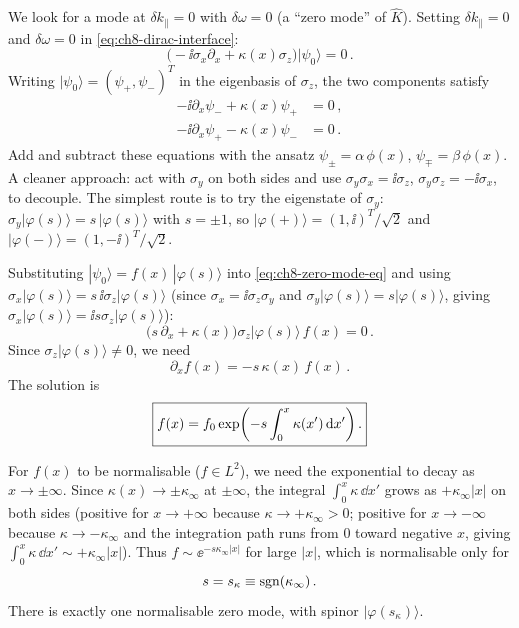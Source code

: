 We look for a mode at $\delta k_\parallel=0$ with $\delta\omega=0$ (a
``zero mode'' of $\hat{K}$).  Setting $\delta k_\parallel=0$ and
$\delta\omega=0$ in \eqref{eq:ch8-dirac-interface}:
\begin{equation}\label{eq:ch8-zero-mode-eq}
  \bigl(-\ii\sigma_x\partial_x + \kappa(x)\sigma_z\bigr)|\psi_0\rangle
  = 0\,.
\end{equation}
Writing $|\psi_0\rangle=(\psi_+,\psi_-)^T$ in the eigenbasis of
$\sigma_z$, the two components satisfy
\begin{subequations}\label{eq:ch8-zero-components}
\begin{align}
  -\ii\partial_x\psi_- + \kappa(x)\psi_+ &= 0\,,\\
  -\ii\partial_x\psi_+ - \kappa(x)\psi_- &= 0\,.
\end{align}
\end{subequations}
Add and subtract these equations with the ansatz
$\psi_\pm = \alpha\,\phi(x)$, $\psi_\mp = \beta\,\phi(x)$. A
cleaner approach: act with $\sigma_y$ on both sides and use
$\sigma_y\sigma_x=\ii\sigma_z$, $\sigma_y\sigma_z=-\ii\sigma_x$, to
decouple.  The simplest route is to try the eigenstate of $\sigma_y$:
$\sigma_y|\varphi(s)\rangle = s\,|\varphi(s)\rangle$ with $s=\pm 1$,
so $|\varphi(+)\rangle=(1,\ii)^T/\sqrt{2}$ and
$|\varphi(-)\rangle=(1,-\ii)^T/\sqrt{2}$.

Substituting $|\psi_0\rangle = f(x)\,|\varphi(s)\rangle$ into
\eqref{eq:ch8-zero-mode-eq} and using $\sigma_x|\varphi(s)\rangle
=s\,\ii\sigma_z|\varphi(s)\rangle$ (since
$\sigma_x=\ii\sigma_z\sigma_y$ and $\sigma_y|\varphi(s)\rangle=s|\varphi(s)\rangle$,
giving $\sigma_x|\varphi(s)\rangle=\ii s\sigma_z|\varphi(s)\rangle$):
\begin{equation}
  \bigl(s\,\partial_x + \kappa(x)\bigr)\sigma_z|\varphi(s)\rangle\,f(x)
  = 0\,.
\end{equation}
Since $\sigma_z|\varphi(s)\rangle\neq 0$, we need
\begin{equation}\label{eq:ch8-zero-mode-ode}
  \partial_x f(x) = -s\,\kappa(x)\,f(x)\,.
\end{equation}
The solution is
\begin{equation}\label{eq:ch8-zero-mode-solution}
  \boxed{%
  f(x) = f_0\exp\biggl(-s\int_0^x\kappa(x')\,\dd x'\biggr)\,.}
\end{equation}

For $f(x)$ to be normalisable ($f\in L^2$), we need the exponential to
decay as $x\to\pm\infty$.  Since $\kappa(x)\to\pm\kappa_\infty$ at
$\pm\infty$, the integral $\int_0^x\kappa\,\dd x'$ grows as
$+\kappa_\infty|x|$ on both sides (positive for $x\to+\infty$
because $\kappa\to+\kappa_\infty>0$; positive for $x\to-\infty$
because $\kappa\to-\kappa_\infty$ and the integration path
runs from $0$ toward negative $x$, giving
$\int_0^x\kappa\,\dd x'\sim+\kappa_\infty|x|$).
Thus $f\sim\ee^{-s\kappa_\infty|x|}$ for large $|x|$,
which is normalisable only for
\begin{equation}\label{eq:ch8-sign-condition}
  s = s_\kappa \equiv \operatorname{sgn}(\kappa_\infty)\,.
\end{equation}
There is exactly one normalisable zero mode, with spinor
$|\varphi(s_\kappa)\rangle$.

